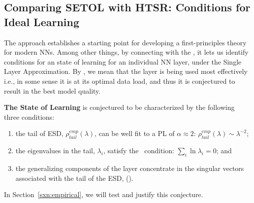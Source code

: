 \subsection{Comparing SETOL with HTSR: Conditions for Ideal Learning}
\label{sxn:ideal_learning}


The \SETOL approach establishes a starting point for developing a first-principles theory for modern NNs. %
Among other things, by connecting with the \HTSR \Phenomenology, it lets us identify conditions for an \Ideal state of learning for an individual NN layer, under the Single Layer Approximation.
By \Ideal, we mean that the layer is being used most effectively i.e., in some sense it is at its optimal data load, and thus it is conjectured to result in the best model quality.

\textbf{The \Ideal State of Learning} is conjectured to be characterized by the following three conditions:
\begin{enumerate} 
\item \label{itm:ideal_1}
  the tail of ESD, $\rho^{emp}_{tail}(\lambda)$, can be well fit to a PL of $\alpha\approx 2$: $\rho^{emp}_{tail}(\lambda)\sim\lambda^{-2}$;
\item \label{itm:ideal_2}
  the eigenvalues in the tail, $\lambda_{i}$, satisfy the \TRACELOG~condition: $\sum_{i}\ln\lambda_{i}=0$; and
\item \label{itm:ideal_3}
  the generalizing components of the layer concentrate in the singular vectors associated with the tail of the ESD, 
         (\EffectiveCorrelationSpace).
\end{enumerate}
In Section~\ref{sxn:empirical}, we will test and justify this conjecture.




